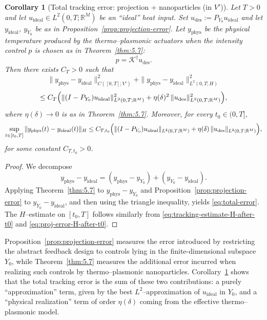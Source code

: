 \documentclass[11pt,a4paper]{article}
\numberwithin{equation}{section}
\newtheorem{corollary}[theorem]{Corollary}
\theoremstyle{definition}
\newcommand{\R}{\mathbb{R}}
\newcommand{\1}{\mathbbm{1}}
\begin{document}
\begin{enumerate}
\begin{corollary}[Total tracking error: projection + nanoparticles (in $V'$)]
\label{cor:total-error}
Let $T>0$ and let $u_{\mathrm{ideal}}\in L^2(0,T;\R^M)$ be an ``ideal'' heat input.
Set $u_{\mathrm{des}}:=P_{Y_0}u_{\mathrm{ideal}}$ and let $y_{\mathrm{ideal}}$, $y_{Y_0}$ be as in
Proposition~\ref{prop:projection-error}. Let $y_{\mathrm{phys}}$ be the physical temperature produced by
the thermo--plasmonic actuators when the intensity control $p$ is chosen as in Theorem~\ref{thm:5.7}:
\[
  p = \mathcal{K}^\dagger u_{\mathrm{des}}.
\]
Then there exists $C_T>0$ such that
$$
\|y_{\mathrm{phys}}-y_{\mathrm{ideal}}\|_{C([0,T];V')}^2 + \|y_{\mathrm{phys}}-y_{\mathrm{ideal}}\|_{L^2(0,T;H)}^2
$$
\begin{equation}
\label{eq:total-error}
\le C_T\Bigl(
\|(I-P_{Y_0})u_{\mathrm{ideal}}\|_{L^2(0,T;\R^M)}^2
+ \eta(\delta)^2\,\|u_{\mathrm{des}}\|_{L^2(0,T;\R^M)}^2
\Bigr),
\end{equation}
where $\eta(\delta)\to 0$ is as in Theorem~\ref{thm:5.7}. Moreover, for every $t_0\in(0,T]$,
\[
\sup_{t\in[t_0,T]}\|y_{\mathrm{phys}}(t)-y_{\mathrm{ideal}}(t)\|_{H}
\le C_{T,t_0}\Bigl(
\|(I-P_{Y_0})u_{\mathrm{ideal}}\|_{L^2(0,T;\R^M)}
+ \eta(\delta)\,\|u_{\mathrm{des}}\|_{L^2(0,T;\R^M)}
\Bigr),
\]
for some constant $C_{T,t_0}>0$.
\end{corollary}

\begin{proof}
We decompose
\[
y_{\mathrm{phys}}-y_{\mathrm{ideal}}=(y_{\mathrm{phys}}-y_{Y_0})+(y_{Y_0}-y_{\mathrm{ideal}}).
\]
Applying Theorem~\ref{thm:5.7} to $y_{\mathrm{phys}}-y_{Y_0}$ and Proposition~\ref{prop:projection-error}
to $y_{Y_0}-y_{\mathrm{ideal}}$, and then using the triangle inequality, yields \eqref{eq:total-error}.
The $H$--estimate on $[t_0,T]$ follows similarly from \eqref{eq:tracking-estimate-H-after-t0} and
\eqref{eq:proj-error-H-after-t0}.
\end{proof}
\end{enumerate}

\medskip

\noindent
Proposition~\ref{prop:projection-error} measures
the error introduced by restricting the abstract feedback design to controls
lying in the finite-dimensional subspace $Y_0$, while Theorem~\ref{thm:5.7} measures
the additional error incurred when realizing such controls by thermo--plasmonic
nanoparticles. Corollary~\ref{cor:total-error} shows that the total tracking
error is the sum of these two contributions: a purely ``approximation'' term,
given by the best $L^2$--approximation of $u_{\mathrm{ideal}}$ in $Y_0$, and
a ``physical realization'' term of order $\eta(\delta)$ coming from the
effective thermo--plasmonic model.
\end{document}
